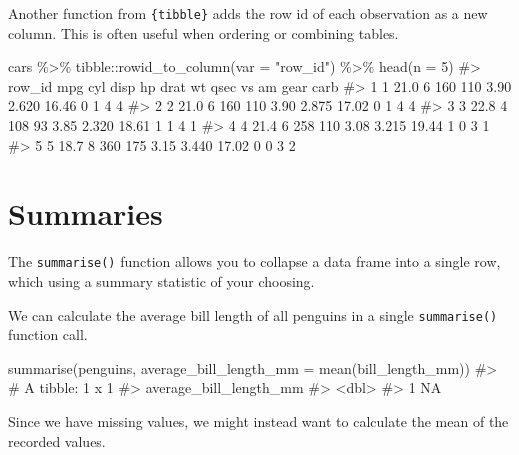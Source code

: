 \documentclass[
  letterpaper,
  DIV=11,
  numbers=noendperiod]{scrreprt}
\newenvironment{Shaded}{\begin{snugshade}}{\end{snugshade}}
\newcommand{\AttributeTok}[1]{\textcolor[rgb]{0.40,0.45,0.13}{#1}}
\newcommand{\CommentTok}[1]{\textcolor[rgb]{0.37,0.37,0.37}{#1}}
\newcommand{\DecValTok}[1]{\textcolor[rgb]{0.68,0.00,0.00}{#1}}
\newcommand{\FunctionTok}[1]{\textcolor[rgb]{0.28,0.35,0.67}{#1}}
\newcommand{\NormalTok}[1]{\textcolor[rgb]{0.00,0.23,0.31}{#1}}
\newcommand{\SpecialCharTok}[1]{\textcolor[rgb]{0.37,0.37,0.37}{#1}}
\newcommand{\StringTok}[1]{\textcolor[rgb]{0.13,0.47,0.30}{#1}}
\begin{document}
Another function from \texttt{\{tibble\}} adds the row id of each
observation as a new column. This is often useful when ordering or
combining tables.

\begin{Shaded}
\begin{Highlighting}[]
\NormalTok{cars }\SpecialCharTok{\%\textgreater{}\%} 
\NormalTok{  tibble}\SpecialCharTok{::}\FunctionTok{rowid\_to\_column}\NormalTok{(}\AttributeTok{var =} \StringTok{"row\_id"}\NormalTok{) }\SpecialCharTok{\%\textgreater{}\%} 
  \FunctionTok{head}\NormalTok{(}\AttributeTok{n =} \DecValTok{5}\NormalTok{)}
\CommentTok{\#\textgreater{}   row\_id  mpg cyl disp  hp drat    wt  qsec vs am gear carb}
\CommentTok{\#\textgreater{} 1      1 21.0   6  160 110 3.90 2.620 16.46  0  1    4    4}
\CommentTok{\#\textgreater{} 2      2 21.0   6  160 110 3.90 2.875 17.02  0  1    4    4}
\CommentTok{\#\textgreater{} 3      3 22.8   4  108  93 3.85 2.320 18.61  1  1    4    1}
\CommentTok{\#\textgreater{} 4      4 21.4   6  258 110 3.08 3.215 19.44  1  0    3    1}
\CommentTok{\#\textgreater{} 5      5 18.7   8  360 175 3.15 3.440 17.02  0  0    3    2}
\end{Highlighting}
\end{Shaded}

\section{Summaries}\label{summaries}

The \texttt{summarise()} function allows you to collapse a data frame
into a single row, which using a summary statistic of your choosing.

We can calculate the average bill length of all penguins in a single
\texttt{summarise()} function call.

\begin{Shaded}
\begin{Highlighting}[]
\FunctionTok{summarise}\NormalTok{(penguins, }\AttributeTok{average\_bill\_length\_mm =} \FunctionTok{mean}\NormalTok{(bill\_length\_mm))}
\CommentTok{\#\textgreater{} \# A tibble: 1 x 1}
\CommentTok{\#\textgreater{}   average\_bill\_length\_mm}
\CommentTok{\#\textgreater{}                    \textless{}dbl\textgreater{}}
\CommentTok{\#\textgreater{} 1                     NA}
\end{Highlighting}
\end{Shaded}

Since we have missing values, we might instead want to calculate the
mean of the recorded values.
\end{document}
